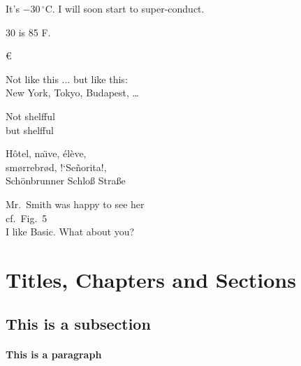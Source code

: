 \documentclass[a4paper,11pt]{book}
\begin{document}
  It's $-30\,^{\circ}\mathrm{C}$.
  I will soon start to 
  super-conduct.

  30 \textcelsius{} is
  85 \textdegree{}F.

  \texteuro
  \euro

  Not like this ... but like this:\\
  New York, Tokyo, Budapest, \ldots

  \Large Not shelfful\\
  but shelf\mbox{}ful

  \normalsize 
  H\^otel, na\"\i ve, \'el\`eve,\\
  sm\o rrebr\o d, !`Se\~norita!,\\
  Sch\"onbrunner Schlo\ss{} 
  Stra\ss e

  Mr.~Smith was happy to see her\\
  cf.~Fig.~5\\
  I like Basic\@. What about you?

  \section{Titles, Chapters and Sections}

  \subsection{This is a subsection}

  \paragraph{This is a paragraph}
\end{document}
